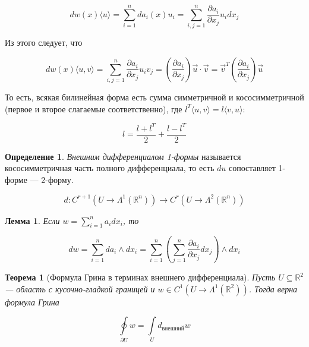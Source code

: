 \documentclass[a5paper]{article}
\newcounter{through}
\theoremstyle{plain}
\newtheorem{theorem}[through]{Теорема}
\newtheorem{lemma}[through]{Лемма}
\theoremstyle{definition}
\newtheorem{definition}[through]{Определение}
\numberwithin{through}{section}
\numberwithin{equation}{section}
\begin{document}
\begin{equation*}
	dw(x) \langle u \rangle = \sum_{i = 1}^{n} da_i(x) u_i = \sum_{i,j = 1}^{n} \frac{\partial a_i}{\partial x_j} u_i dx_j
\end{equation*}

Из этого следует, что 

\begin{equation*}
	dw(x) \langle u, v \rangle = \sum_{i,j = 1}^{n} \frac{\partial a_i}{\partial x_j} u_i v_j = (\frac{\partial a_i}{\partial x_j}) \vec{u} \cdot \vec{v} = \vec{v}^T (\frac{\partial a_i}{\partial x_j}) \vec{u}
\end{equation*}

То есть, всякая билинейная форма есть сумма симметричной и кососимметричной (первое и второе слагаемые соответственно), где $l^T \langle u, v \rangle = l \langle v, u \rangle$:

\begin{equation*}
	l = \frac{l + l^T}{2} + \frac{l - l^T}{2}
\end{equation*} 

\begin{definition}
	\textit{Внешним дифференциалом 1-формы} называется кососимметричная часть полного дифференциала, то есть $du$ сопоставляет 1-форме --- 2-форму.
	
	\begin{equation*}
		d : C^{r+1} (U \to \Lambda^1(\mathbb{R}^n)) \to C^{r} (U \to \Lambda^2(\mathbb{R}^n))
	\end{equation*}
\end{definition}


\begin{lemma}
	Если $w = \sum\limits_{i=1}^{n} a_i dx_i$, то 
	
	\begin{equation*}
		dw = \sum_{i=1}^{n} da_i \wedge dx_i = \sum_{i=1}^{n} \left(\sum_{j=1}^{n} \frac{\partial a_i}{\partial x_j} dx_j\right) \wedge dx_i
	\end{equation*}
\end{lemma}

\begin{theorem}[Формула Грина в терминах внешнего дифференциала]
	Пусть $U \subseteq \mathbb{R}^2$ --- область с кусочно-гладкой границей и $w \in C^1 (U \to \Lambda^1(\mathbb{R}^2))$. Тогда верна формула Грина
	
	\begin{equation*}
		\oint\limits_{\partial U} w = \int\limits_{U} d_{\text{внешний}}w
	\end{equation*}
\end{theorem}
\end{document}
